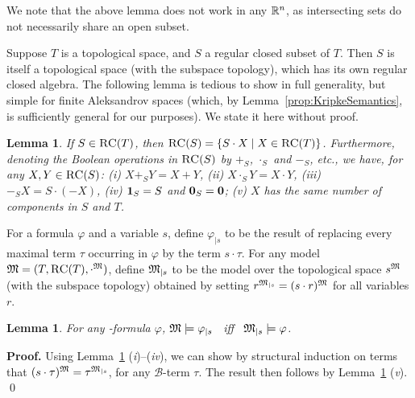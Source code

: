 \documentclass{LMCS}
\renewenvironment{proof}{\par\noindent\textbf{Proof.}}{\mbox{}\qed\par\medskip}
\theoremstyle{plain}
\newtheorem{lemma}[thm]{Lemma}
\newcommand{\cB}{\ensuremath{\mathcal{B}}}\newcommand{\cBc}{\ensuremath{\mathcal{B}c}}\newcommand{\cBcc}{\ensuremath{\mathcal{B}cc}}
\begin{document}
We note that the above lemma does not work in any $\mathbb{R}^n$, as
intersecting sets do not necessarily share an open subset.

Suppose $T$ is a topological space, and $S$ a regular closed subset of
$T$. Then $S$ is itself a topological space (with the subspace
topology), which has its own regular closed algebra. The following
lemma is tedious to show in full generality, but simple for finite
Aleksandrov spaces (which, by Lemma~\ref{prop:KripkeSemantics}, is
sufficiently general for our purposes). We state it here without
proof.
\begin{lemma}\label{lma:regularSubspaceLemma}
If $S \in \textsc{RC}(T)$, then $\textsc{RC}(S) = \{ S \cdot X \mid X \in \textsc{RC}(T)
\}$. Furthermore, denoting the Boolean operations in $\textsc{RC}(S)$ by
$+_S$, $\cdot_S$ and $-_S$, etc., we have, for any $X, Y
\in \textsc{RC}(S)$\textup{:} \textup{(}i\textup{)} $X +_S Y= X + Y$,
\textup{(}ii\textup{)} $X \cdot_S Y = X \cdot Y$,
\textup{(}iii\textup{)} $-_S X= S \cdot (-X)$, \textup{(}iv\textup{)}
$\mathbf{1}_S = S$ and $\mathbf{0}_S = \mathbf{0}$; \textup{(}v\textup{)} $X$
has the same number of components in $S$ and $T$.
\end{lemma}For a formula $\varphi$ and a
variable $s$, define $\varphi_{\mid s}$ to be the result of replacing
every maximal term $\tau$ occurring in $\varphi$ by the
term $s\cdot \tau$. For any model $\mathfrak{M} = (T, \textsc{RC}(T), \cdot^{\mathfrak{M}})$,
define $\mathfrak{M}_{\mid s}$ to be the model over the topological
space $s^{\mathfrak{M}}$ (with the subspace topology) obtained by setting
$r^{\mathfrak{M}_{\mid s}} = (s \cdot r)^{\mathfrak{M}}$ for all variables $r$.
\begin{lemma}
\label{lma:subspaceEquisatisfiability}
For any \cBCcc-formula  $\varphi$, $\mathfrak{M} \models \varphi_{\mid s}$ \ iff \
$\mathfrak{M}_{\mid s} \models \varphi$.
\end{lemma}
\begin{proof}
Using Lemma~\ref{lma:regularSubspaceLemma} (\emph{i})--(\emph{iv}),
we can show by structural induction on terms that $(s\cdot \tau)^{\mathfrak{M}} =
\tau^{\mathfrak{M}_{\mid s}}$, for any $\cB$-term $\tau$.  The result then
follows by Lemma~\ref{lma:regularSubspaceLemma} (\emph{v}).
\end{proof}
\end{document}
